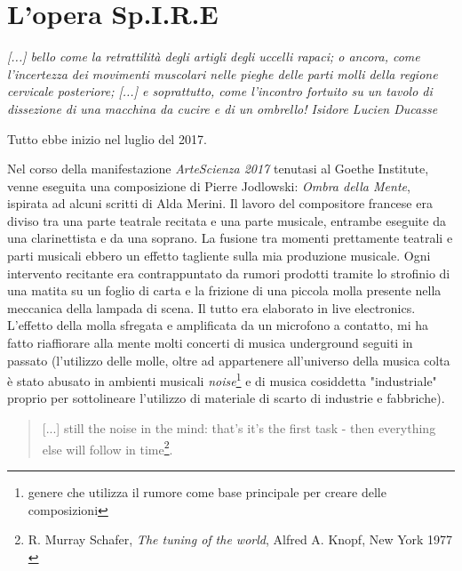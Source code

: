 
\chapter{L'opera Sp.I.R.E}
\label{chp:L'opera Sp.I.R.E}

	\begin{flushright}
		\textit{[...] bello come la retrattilità degli artigli degli uccelli rapaci; o ancora, come l'incertezza dei movimenti muscolari nelle pieghe delle parti molli della regione cervicale posteriore; [...] e soprattutto, come l'incontro fortuito su un tavolo di dissezione di una macchina da cucire e di un ombrello!
		Isidore Lucien Ducasse}
	\end{flushright}

Tutto ebbe inizio nel luglio del 2017.

Nel corso della manifestazione \textit{ArteScienza 2017} tenutasi al Goethe Institute, venne eseguita una composizione di Pierre Jodlowski: \textit{Ombra della Mente}, ispirata ad alcuni scritti di Alda Merini. Il lavoro del compositore francese era diviso tra una parte teatrale recitata e una parte musicale, entrambe eseguite da una clarinettista e da una soprano. La fusione tra momenti prettamente teatrali e parti musicali ebbero un effetto tagliente sulla mia produzione musicale. Ogni intervento recitante era contrappuntato da rumori prodotti tramite lo strofinio di una matita su un foglio di carta e la frizione di una piccola molla presente nella meccanica della lampada di scena. Il tutto era elaborato in live electronics. L'effetto della molla sfregata e amplificata da un microfono a contatto, mi ha fatto riaffiorare alla mente molti concerti di musica underground seguiti in passato (l'utilizzo delle molle, oltre ad appartenere all'universo della musica colta è stato abusato in ambienti musicali \textit{noise}\footnote{genere che utilizza il rumore come base principale per creare delle composizioni} e di musica cosiddetta "industriale" proprio per sottolineare l'utilizzo di materiale di scarto di industrie e fabbriche).

\begin{small}
\begin{quotation}
[...] still the noise in the mind: that's it's the first task - then everything else will follow in time\footnote{R. Murray Schafer, \textit{The tuning of the world}, Alfred A. Knopf, New York 1977 \\}.
\end{quotation}
\end{small}

